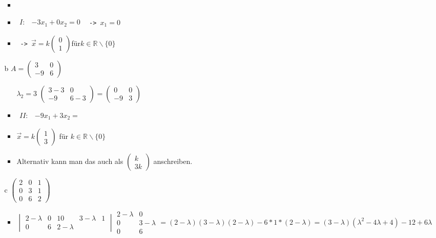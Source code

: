 \documentclass{article}
\newcommand{\R}{\mathbb{R}}
\begin{document}
\begin{itemize}
\begin{itemize}
\begin{itemize}
				\item{}
				\item{$\begin{matrix} I: & -3x_1+0x_2=0 \end{matrix}$ \texttt{ -> }$x_1=0$}
				\item{\texttt{ -> }$\vec{x}=k \begin{pmatrix} 0 \\ 1 \end{pmatrix}$für$k\in\R\backslash\{0\}$}
			\end{itemize}
			\item[b]{$A=\begin{pmatrix} 3 & 0 \\ -9 & 6 \end{pmatrix}$}
			\begin{itemize}
				\item[$\lambda_2=3$]{$\begin{pmatrix} 3-3 & 0 \\ -9 & 6-3 \end{pmatrix}=\begin{pmatrix} 0 & 0 \\ -9 & 3 \end{pmatrix}$}
				\item{$\begin{matrix} II: & -9x_1+3x_2= \end{matrix}$}
				\item{$\vec{x}=k \begin{pmatrix} 1 \\ 3 \end{pmatrix}$ für $k\in\R\backslash\{0\}$}
				\item{Alternativ kann man das auch als $\begin{pmatrix} k \\ 3k \end{pmatrix}$ anschreiben.}
			\end{itemize}
			\item[c]{$\begin{pmatrix} 2 & 0 & 1 \\ 0 & 3 & 1 \\ 0 & 6 & 2 \end{pmatrix}$}
			\begin{itemize}
				\item{$\begin{vmatrix} 2-\lambda & 0 & 10 & 3-\lambda & 1 \\ 0 & 6 & 2-\lambda \end{vmatrix}\begin{matrix} 2-\lambda & 0 \\ 0 & 3-\lambda \\ 0 & 6 \end{matrix}=(2-\lambda)(3-\lambda)(2-\lambda)-6*1*(2-\lambda)=(3-\lambda)(\lambda^2-4\lambda+4)-12+6\lambda$}

\end{itemize}
\end{itemize}
\end{itemize}
\end{document}
